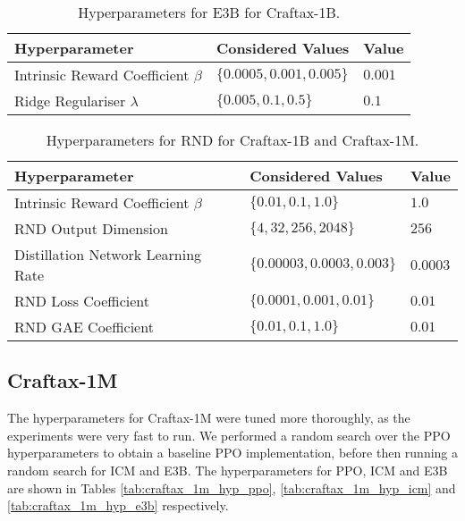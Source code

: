 \documentclass{article}
\theoremstyle{plain}
\theoremstyle{definition}
\theoremstyle{remark}
\begin{document}
\begin{table*}[t]
\centering
\begin{tabular}{@{}l l l@{}} 
    \toprule
    \textbf{Hyperparameter} & \textbf{Considered Values} & \textbf{Value} \\
    \midrule
    Intrinsic Reward Coefficient $\beta$ & $\{0.0005, 0.001, 0.005\}$ & $0.001$ \\
    Ridge Regulariser $\lambda$ & $\{0.005, 0.1, 0.5\}$ & $0.1$ \\
    \bottomrule
\end{tabular}
\caption{Hyperparameters for E3B for Craftax-1B.}
\label{tab:craftax_1b_hyp_e3b}
\end{table*}

\begin{table*}[t]
\centering
\begin{tabular}{@{}l l l@{}} 
    \toprule
    \textbf{Hyperparameter} & \textbf{Considered Values} & \textbf{Value} \\
    \midrule
    Intrinsic Reward Coefficient $\beta$ & $\{0.01, 0.1, 1.0\}$ & $1.0$ \\
    RND Output Dimension & $\{4, 32, 256, 2048\}$ & $256$ \\
    Distillation Network Learning Rate & $\{0.00003, 0.0003, 0.003\}$ & $0.0003$ \\
    RND Loss Coefficient & $\{0.0001, 0.001, 0.01\}$ & $0.01$ \\
    RND GAE Coefficient & $\{0.01, 0.1, 1.0\}$ & $0.01$ \\
    \bottomrule
\end{tabular}
\caption{Hyperparameters for RND for Craftax-1B and Craftax-1M.}
\label{tab:craftax_hyp_rnd}
\end{table*}

\subsection{Craftax-1M}
The hyperparameters for Craftax-1M were tuned more thoroughly, as the experiments were very fast to run.  We performed a random search over the PPO hyperparameters to obtain a baseline PPO implementation, before then running a random search for ICM and E3B.  The hyperparameters for PPO, ICM and E3B are shown in Tables \ref{tab:craftax_1m_hyp_ppo}, \ref{tab:craftax_1m_hyp_icm} and \ref{tab:craftax_1m_hyp_e3b} respectively.
\end{document}
